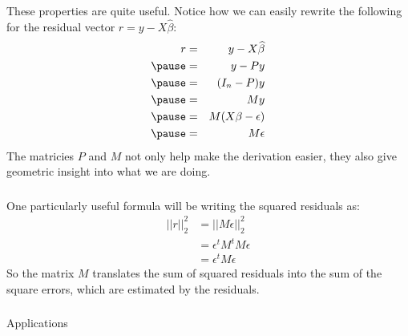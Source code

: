 \begin{frame}[fragile] \frametitle{}

These properties are quite useful. Notice how we can
easily rewrite the following for the residual vector
$r = y - X\widehat{\beta}$:
\begin{eqnarray*}
r  &=& y - X\widehat{\beta} \\ \pause
&=& y - Py \\ \pause
&=& (I_n - P) y \\ \pause
&=& M y \\ \pause
&=& M (X \beta - \epsilon) \\ \pause
&=& M \epsilon \\
\end{eqnarray*}
\pause The matricies $P$ and $M$ not only help make the
derivation easier, they also give geometric insight into
what we are doing.

\end{frame}

\begin{frame}[fragile] \frametitle{}

One particularly useful formula will be writing the
squared residuals as:
\begin{align*}
||r||_2^2 &= || M \epsilon ||_2^2 \\
&= \epsilon^t M^t M \epsilon \\
&= \epsilon^t M \epsilon
\end{align*}
\pause So the matrix $M$ translates the sum of squared residuals
into the sum of the square errors, which are estimated by the
residuals.

\end{frame}

\begin{frame}[fragile] \frametitle{}

\begin{flushright}
{\color{yaleblue}\sc\fontsize{1cm}{0cm}\selectfont Applications}
\end{flushright}

\end{frame}















